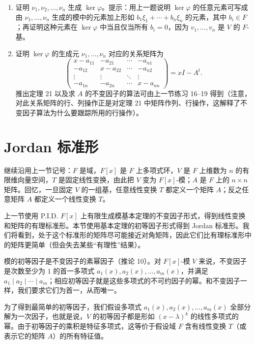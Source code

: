 \begin{enumerate}[label=\arabic*.]
\item 证明 $\nu_1,
\nu_2,
\ldots,
\nu_n$ 生成 $\ker\varphi$。提示：用上一题说明 $\ker\varphi$ 的任意元素可写成由 $\nu_1,
\ldots,
\nu_n$ 生成的模中的元素加上形如 $b_1\xi_1+\cdots+b_n\xi_n$ 的元素，其中 $b_i\in F$；再证明这种元素在 $\ker\varphi$ 中当且仅当所有 $b_i=0$，因为 $v_1,
\ldots,v_n$ 是 $V$ 的 $F$-基。

\item 证明 $\ker\varphi$ 的生成元 $\nu_1,
\ldots,
\nu_n$ 对应的关系矩阵为
\[
\begin{pmatrix}
 x-a_{11}&-a_{21}&\cdots&-a_{n1}\\
 -a_{12}&x-a_{22}&\cdots&-a_{n2}\\
 \vdots&\vdots&\ddots&\vdots\\
 -a_{1n}&-a_{2n}&\cdots&x-a_{nn}
\end{pmatrix}=xI-A^t.
\]
推出定理 21 以及求 $A$ 的不变因子的算法可由上一节练习 16--19 得到（注意，对此关系矩阵的行、列操作正是对定理 21 中矩阵作列、行操作，这解释了不变因子算法为什么要跟踪所用的行操作）。
\end{enumerate}



\section{Jordan 标准形}

继续沿用上一节记号：$F$ 是域，$F[x]$ 是 $F$ 上多项式环，$V$ 是 $F$ 上维数为 $n$ 的有限维向量空间，$T$ 是固定线性变换，由此把 $V$ 变为 $F[x]$-模；$A$ 是 $F$ 上的 $n\times n$ 矩阵。回忆，一旦固定 $V$ 的一组基，任意线性变换 $T$ 都定义一个矩阵 $A$；反之任意矩阵 $A$ 都定义一个线性变换 $T$。

上一节使用 P.I.D. $F[x]$ 上有限生成模基本定理的不变因子形式，得到线性变换和矩阵的有理标准形。本节使用基本定理的初等因子形式得到 Jordan 标准形。我们将看到，处于这个标准形的矩阵尽可能接近对角矩阵，因此它们比有理标准形中的矩阵更简单（但会失去某些“有理性”结果）。

模的初等因子是不变因子的素幂因子（推论 10）。对 $F[x]$-模 $V$ 来说，不变因子是次数至少为 $1$ 的首一多项式 $a_1(x),a_2(x),\ldots,a_m(x)$，并满足 $a_1\mid a_2\mid\cdots\mid a_m$；相应初等因子就是这些多项式的不可约因子的幂。和不变因子一样，我们要求它们为首一，从而唯一。

为了得到最简单的初等因子，我们假设多项式 $a_1(x),a_2(x),\ldots,a_m(x)$ 全部分解为一次因子，也就是说，$V$ 的初等因子都是形如 $(x-\lambda)^k$ 的线性多项式的幂。由于初等因子的乘积是特征多项式，这等价于假设域 $F$ 含有线性变换 $T$（或表示它的矩阵 $A$）的所有特征值。

